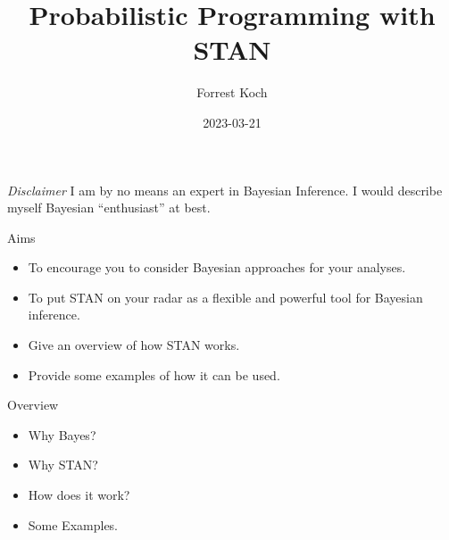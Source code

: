 \documentclass[
  ignorenonframetext,
]{beamer}
\title{Probabilistic Programming with STAN}
\author{Forrest Koch}
\date{2023-03-21}
\providecommand{\tightlist}{%
  \setlength{\itemsep}{0pt}\setlength{\parskip}{0pt}}
\begin{document}
\frame{\titlepage}

\begin{frame}{\emph{Disclaimer}}
\protect\hypertarget{disclaimer}{}
I am by no means an expert in Bayesian Inference. I would describe
myself Bayesian ``enthusiast'' at best.
\end{frame}

\begin{frame}{Aims}
\protect\hypertarget{aims}{}
\begin{itemize}
\tightlist
\item
  To encourage you to consider Bayesian approaches for your analyses.
\item
  To put STAN on your radar as a flexible and powerful tool for Bayesian
  inference.
\item
  Give an overview of how STAN works.
\item
  Provide some examples of how it can be used.
\end{itemize}
\end{frame}

\begin{frame}{Overview}
\protect\hypertarget{overview}{}
\begin{itemize}
\tightlist
\item
  Why Bayes?
\item
  Why STAN?
\item
  How does it work?
\item
  Some Examples.
\end{itemize}
\end{frame}
\end{document}
